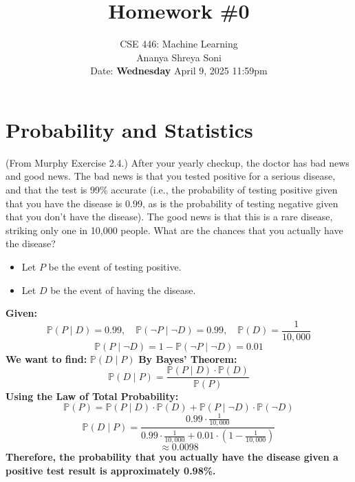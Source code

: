 \documentclass{article}
\begin{document}
\setcounter{aprob}{0}
\setcounter{bprob}{0}
\title{Homework \#0}
\author{
    \normalsize{CSE 446: Machine Learning}\\
    \normalsize{Ananya Shreya Soni}\\
    \normalsize{Date: \textbf{Wednesday} April 9, 2025 11:59pm}\\
}
\date{{}}
\maketitle




\section*{Probability and Statistics}
\begin{aprob}
     (From Murphy Exercise 2.4.) 
    After your yearly checkup, the doctor has bad news and good news. 
    The bad news is that you tested positive for a serious disease, and that the test is 99\% accurate (i.e., the probability of testing positive given that you have the disease is 0.99, as is the probability of testing negative given that you don't have the disease).
    The good news is that this is a rare disease, striking only one in 10,000 people.
    What are the chances that you actually have the disease?
    \begin{tcolorbox}[colback=lightgray!10!white, colframe=black, title=A1]
        \begin{itemize}
            \item Let $P$ be the event of testing positive.
            \item Let $D$ be the event of having the disease.
        \end{itemize}
        \textbf{Given:}
        \[
        \mathbb{P}(P \mid D) = 0.99, \quad \mathbb{P}(\neg P \mid \neg D) = 0.99, \quad \mathbb{P}(D) = \frac{1}{10,000}
        \]
        \[
        \mathbb{P}(P \mid \neg D) = 1 - \mathbb{P}(\neg P \mid \neg D) = 0.01
        \]
        \textbf{We want to find:} $\mathbb{P}(D \mid P)$
        \textbf{By Bayes’ Theorem:}
        \[
        \mathbb{P}(D \mid P) = 
        \frac{\mathbb{P}(P \mid D) \cdot \mathbb{P}(D)}{\mathbb{P}(P)}
        \]
        \textbf{Using the Law of Total Probability:}
        \[
        \mathbb{P}(P) = \mathbb{P}(P \mid D) \cdot \mathbb{P}(D) + \mathbb{P}(P \mid \neg D) \cdot \mathbb{P}(\neg D)
        \]
        \[
        \mathbb{P}(D \mid P) =
        \frac{0.99 \cdot \frac{1}{10,000}}{0.99 \cdot \frac{1}{10,000} + 0.01 \cdot \left(1 - \frac{1}{10,000}\right)}
        \]
        \[
        \approx 0.0098
        \]
        \textbf{Therefore, the probability that you actually have the disease given a positive test result is approximately 0.98\%.}
    \end{tcolorbox}
\end{aprob}
\end{document}
